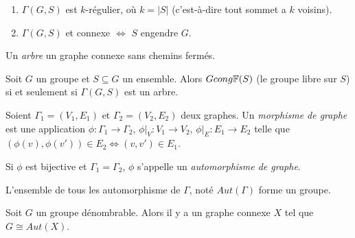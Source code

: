   \begin{propri}
    \begin{enumerate}
    \item $\Gamma(G,S)$ est $k$-régulier, où $k = |S|$ (c'est-à-dire tout sommet a $k$ voisins).
    \item $\Gamma(G,S)$ et connexe $\iff$ $S$ engendre $G$.
    \end{enumerate}
  \end{propri}

  \begin{defi} 
    Un \emph{arbre} un graphe connexe sans chemins fermés.
  \end{defi}

  \begin{prop}
    Soit $G$ un groupe et $S \subseteq G$ un ensemble. Alors $G cong \mathbb{F}(S)$ (le groupe libre sur $S$) si et
    seulement si $\Gamma(G, S)$ est un arbre.
  \end{prop}


  \begin{defi}
    Soient $\Gamma_1 = (V_1, E_1)$ et $\Gamma_2 = (V_2, E_2)$ deux graphes. Un \emph{morphisme de graphe}
     est une application $\phi: \Gamma_1 \to \Gamma_2$, $\phi \big|_V : V_1 \to
    V_2$, $\phi \big|_E : E_1 \to E_2$ telle que $(\phi(v), \phi(v')) \in E_2 \iff (v, v') \in E_1$.

    Si $\phi$ est bijective et $\Gamma_1 = \Gamma_2$, $\phi$ s'appelle un \emph{automorphisme de graphe}.

    L'ensemble de tous les automorphisme de $\Gamma$, noté $Aut(\Gamma)$ forme un groupe.
  \end{defi}


  \begin{theo}
    Soit $G$ un groupe dénombrable. Alors il y a un graphe connexe $X$ tel que $G \cong Aut(X)$.
  \end{theo}

